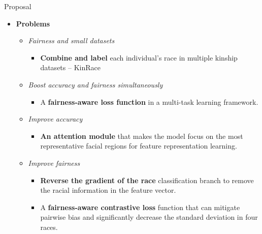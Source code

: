 \documentclass[aspectratio=169,xcolor=dvipsnames]{beamer}
\begin{document}
\begin{frame}{Proposal}
    \begin{itemize}
        \item \textbf{Problems}
        \begin{itemize}
            \item \textit{Fairness and small datasets} 
            \begin{itemize}
                \item \textbf{Combine and label} each individual's race in multiple kinship datasets -- KinRace
            \end{itemize}
            \item \textit{Boost accuracy and fairness simultaneously}
            \begin{itemize}
                \item A \textbf{fairness-aware loss function} in a multi-task learning framework.
            \end{itemize}
            \item \textit{Improve accuracy}
            \begin{itemize}
                \item \textbf{An attention module} that makes the model focus on the most representative facial regions for feature representation learning.
            \end{itemize}
            \item \textit{Improve fairness} 
            \begin{itemize}
                \item \textbf{Reverse the gradient of the race} classification branch to remove the racial information in the feature vector.
                \item A \textbf{fairness-aware contrastive loss} function that can mitigate pairwise bias and significantly decrease the standard deviation in four races.
            \end{itemize}
        \end{itemize}
    \end{itemize}
\end{frame}

\end{document}
